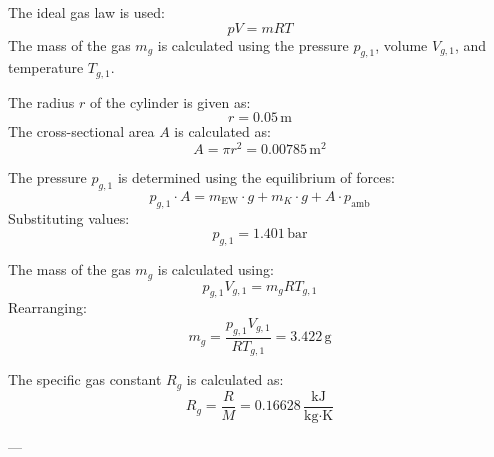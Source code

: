 The ideal gas law is used:  
\[
p V = m R T
\]  
The mass of the gas \( m_g \) is calculated using the pressure \( p_{g,1} \), volume \( V_{g,1} \), and temperature \( T_{g,1} \).  

The radius \( r \) of the cylinder is given as:  
\[
r = 0.05 \, \text{m}
\]  
The cross-sectional area \( A \) is calculated as:  
\[
A = \pi r^2 = 0.00785 \, \text{m}^2
\]  

The pressure \( p_{g,1} \) is determined using the equilibrium of forces:  
\[
p_{g,1} \cdot A = m_{\text{EW}} \cdot g + m_K \cdot g + A \cdot p_{\text{amb}}
\]  
Substituting values:  
\[
p_{g,1} = 1.401 \, \text{bar}
\]  

The mass of the gas \( m_g \) is calculated using:  
\[
p_{g,1} V_{g,1} = m_g R T_{g,1}
\]  
Rearranging:  
\[
m_g = \frac{p_{g,1} V_{g,1}}{R T_{g,1}} = 3.422 \, \text{g}
\]  

The specific gas constant \( R_g \) is calculated as:  
\[
R_g = \frac{R}{M} = 0.16628 \, \frac{\text{kJ}}{\text{kg·K}}
\]  

---